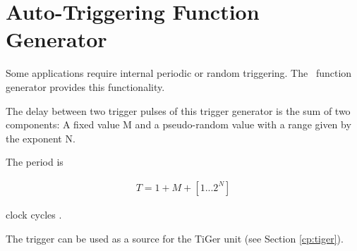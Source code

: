 
\section{Auto-Triggering Function Generator\label{cp:AutoTriggeringFunctionGenerator}}
Some applications require internal periodic or random triggering. The \deviceName\ function generator provides this functionality.\par

The delay between two trigger pulses of this trigger generator is the sum of two components: A fixed value M and a pseudo-random value with a range given by the exponent N. \par

The period is

\begin{align}
    T = 1 + M + [1...2^N]
\end{align}

clock cycles .\par

The trigger can be used as a source for the TiGer unit (see Section \ref{cp:tiger}).


